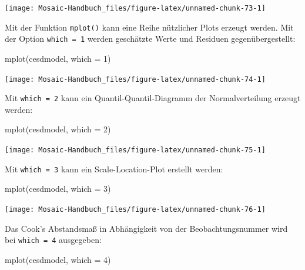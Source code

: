 \documentclass[
  ngerman,
]{scrbook}
\newenvironment{Shaded}{\begin{snugshade}}{\end{snugshade}}
\newcommand{\AttributeTok}[1]{\textcolor[rgb]{0.77,0.63,0.00}{#1}}
\newcommand{\DecValTok}[1]{\textcolor[rgb]{0.00,0.00,0.81}{#1}}
\newcommand{\FunctionTok}[1]{\textcolor[rgb]{0.00,0.00,0.00}{#1}}
\newcommand{\NormalTok}[1]{#1}
\begin{document}
\begin{center}\texttt{[image: Mosaic-Handbuch\_files/figure-latex/unnamed-chunk-73-1]} \end{center}

Mit der Funktion \texttt{mplot()} kann eine Reihe nützlicher Plots erzeugt werden. Mit der Option \texttt{which\ =\ 1} werden geschätzte Werte und Residuen gegenübergestellt:

\begin{Shaded}
\begin{Highlighting}[]
\FunctionTok{mplot}\NormalTok{(cesdmodel, }\AttributeTok{which =} \DecValTok{1}\NormalTok{)}
\end{Highlighting}
\end{Shaded}

\begin{center}\texttt{[image: Mosaic-Handbuch\_files/figure-latex/unnamed-chunk-74-1]} \end{center}

Mit \texttt{which\ =\ 2} kann ein Quantil-Quantil-Diagramm der Normalverteilung erzeugt werden:

\begin{Shaded}
\begin{Highlighting}[]
\FunctionTok{mplot}\NormalTok{(cesdmodel, }\AttributeTok{which =} \DecValTok{2}\NormalTok{)}
\end{Highlighting}
\end{Shaded}

\begin{center}\texttt{[image: Mosaic-Handbuch\_files/figure-latex/unnamed-chunk-75-1]} \end{center}

Mit \texttt{which\ =\ 3} kann ein Scale-Location-Plot erstellt werden:

\begin{Shaded}
\begin{Highlighting}[]
\FunctionTok{mplot}\NormalTok{(cesdmodel, }\AttributeTok{which =} \DecValTok{3}\NormalTok{)}
\end{Highlighting}
\end{Shaded}

\begin{center}\texttt{[image: Mosaic-Handbuch\_files/figure-latex/unnamed-chunk-76-1]} \end{center}

Das Cook's Abstandsmaß in Abhängigkeit von der Beobachtungsnummer wird bei \texttt{which\ =\ 4} ausgegeben:

\begin{Shaded}
\begin{Highlighting}[]
\FunctionTok{mplot}\NormalTok{(cesdmodel, }\AttributeTok{which =} \DecValTok{4}\NormalTok{)}
\end{Highlighting}
\end{Shaded}
\end{document}
